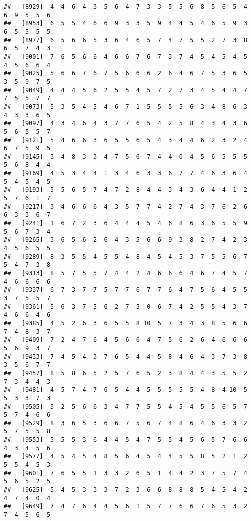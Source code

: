 \documentclass[
]{book}
\begin{document}
\begin{verbatim}
##   [8929]  4  4  6  4  3  5  6  4  7  3  3  5  5  6  8  5  6  5  4  6  9  5  5  6
##   [8953]  6  5  5  4  6  6  9  3  3  5  9  4  4  5  4  6  5  9  3  6  5  5  5  5
##   [8977]  6  5  6  6  5  3  6  4  6  5  7  4  7  5  5  2  7  3  8  6  5  7  4  3
##   [9001]  7  6  5  6  6  4  6  6  7  6  7  3  7  4  5  4  5  4  5  4  5  6  6  4
##   [9025]  5  6  6  7  6  7  5  6  6  6  2  6  4  6  7  5  3  6  5  3  5  9  7  5
##   [9049]  4  4  4  5  6  2  5  5  4  5  7  2  7  3  4  5  4  4  7  7  5  5  7  7
##   [9073]  5  3  5  4  5  4  6  7  1  5  5  5  5  6  3  4  8  6  3  4  3  3  6  5
##   [9097]  4  3  4  6  4  3  7  7  6  5  4  2  5  8  4  3  4  3  6  5  6  5  5  7
##   [9121]  5  4  6  6  3  6  5  5  6  5  4  3  4  4  6  2  3  2  4  6  7  5  9  5
##   [9145]  3  4  8  3  3  4  7  5  6  7  4  4  0  4  5  6  5  5  5  5  6  8  4  4
##   [9169]  4  5  3  4  4  1  3  4  6  3  3  6  7  7  4  6  3  6  4  5  4  5  4  5
##   [9193]  5  5  6  5  7  4  7  2  8  4  4  3  4  3  6  4  4  1  2  5  7  6  1  7
##   [9217]  3  4  6  6  6  4  3  5  7  7  4  2  7  4  3  7  6  2  6  6  3  3  6  7
##   [9241]  1  6  7  2  3  6  4  4  4  5  4  6  8  6  3  6  5  5  9  5  6  7  3  4
##   [9265]  3  6  5  6  2  6  4  3  5  6  6  9  3  8  2  7  4  2  3  4  5  6  5  5
##   [9289]  8  3  5  5  4  5  5  4  8  4  5  4  5  3  7  5  5  6  7  5  4  7  3  8
##   [9313]  8  5  7  5  5  7  4  4  2  4  6  6  6  4  6  7  4  5  7  4  6  6  6  6
##   [9337]  6  7  3  7  7  5  7  7  6  7  7  6  4  7  5  6  4  5  5  3  7  5  5  7
##   [9361]  5  6  3  7  5  6  2  7  5  0  6  7  4  2  5  5  4  3  7  4  6  6  4  6
##   [9385]  4  5  2  6  3  6  5  5  8 10  5  7  3  4  3  8  5  6  6  7  4  8  3  7
##   [9409]  7  2  4  7  6  4  5  6  6  4  7  5  6  2  6  4  6  6  6  5  6  9  3  7
##   [9433]  7  4  5  4  3  7  6  5  4  4  5  8  4  6  4  3  7  3  8  3  5  6  7  7
##   [9457]  8  5  8  6  5  2  5  7  6  5  2  3  8  4  4  3  5  5  2  7  3  4  4  3
##   [9481]  4  5  7  4  7  6  5  4  4  5  5  5  5  5  4  8  4 10  5  5  3  3  7  3
##   [9505]  5  2  5  6  6  3  4  7  7  5  5  4  5  4  5  5  6  5  7  5  7  4  6  6
##   [9529]  8  3  6  5  3  6  6  7  5  6  7  4  8  6  4  6  3  3  2  5  7  5  5  8
##   [9553]  5  5  5  3  6  4  4  5  4  7  5  5  4  5  6  5  7  6  6  4  3  4  5  6
##   [9577]  4  5  4  5  4  8  5  6  4  5  4  4  5  5  8  5  2  1  2  5  5  4  5  3
##   [9601]  7  6  5  5  1  3  3  2  6  5  1  4  4  2  3  7  5  7  4  5  6  5  2  5
##   [9625]  5  4  5  3  3  3  7  2  3  6  6  8  8  8  5  4  5  4  2  4  7  4  0  4
##   [9649]  7  4  7  6  4  4  5  6  1  5  7  7  6  6  7  6  5  3  2  7  4  5  6  5

\end{verbatim}
\end{document}
